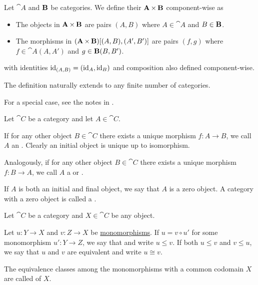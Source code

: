 \begin{definition}\label{def:product_category}
  Let \( \cat{A} \) and \( \operatorname{\mathbf{B}} \) be categories. We define their  \( \operatorname{\mathbf{A}} \times \operatorname{\mathbf{B}} \) component-wise as
  \begin{itemize}
    \item The objects in \( \operatorname{\mathbf{A}} \times \operatorname{\mathbf{B}} \) are pairs \( (A, B) \) where \( A \in \cat{A} \) and \( B \in \operatorname{\mathbf{B}} \).
    \item The morphisms in \( (\operatorname{\mathbf{A}} \times \operatorname{\mathbf{B}})[(A, B), (A', B')] \) are pairs \( (f, g) \) where \( f \in \cat{A}(A, A') \) and \( g \in \operatorname{\mathbf{B}}(B, B') \).
  \end{itemize}
  with identities \( \operatorname{id}_{(A,B)} =(\operatorname{id}_A, \operatorname{id}_B) \) and composition also defined component-wise.

  The definition naturally extends to any finite number of categories.

  For a special case, see the notes in .
\end{definition}

\begin{definition}\label{def:zero_objects}
  Let \( \cat{C} \) be a category and let \( A \in \cat{C} \).

  \begin{thmenum}
     If for any other object \( B \in \cat{C} \) there exists a unique morphism \( f: A \to B \), we call \( A \) an . Clearly an initial object is unique up to isomorphism.

     Analogously, if for any other object \( B \in \cat{C} \) there exists a unique morphism \( f: B \to A \), we call \( A \) a  or .

     If \( A \) is both an initial and final object, we say that \( A \) is a zero object. A category with a zero object is called a .
  \end{thmenum}
\end{definition}

\begin{definition}\label{def:categorical_subobject}
  Let \( \cat{C} \) be a category and \( X \in \cat{C} \) be any object.

  Let \( u: Y \to X \) and \( v: Z \to X \) be \hyperref[def:morphism_invertibility]{monomorphisms}. If \( u = v \circ u' \) for some monomorphism \( u': Y \to Z \), we say that  and write \( u \leq v \). If both \( u \leq v \) and \( v \leq u \), we say that \( u \) and \( v \) are equivalent and write \( u \cong v \).

  The equivalence classes among the monomorphisms with a common codomain \( X \) are called  of \( X \).
\end{definition}
